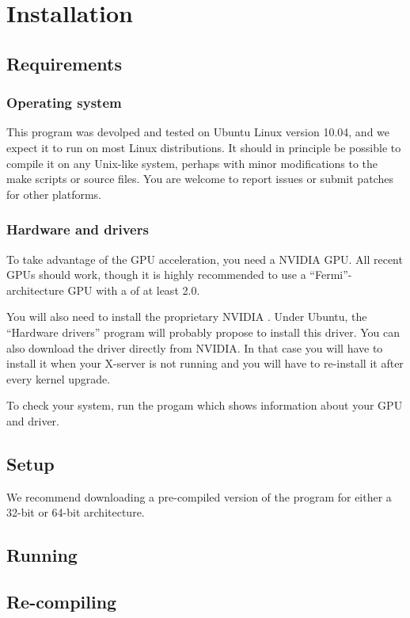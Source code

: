 \section{Installation}

\subsection{Requirements}

\subsubsection{Operating system}

This program was devolped and tested on Ubuntu Linux version 10.04, and we expect it to run on most Linux distributions. It should in principle be possible to compile it on any Unix-like system, perhaps with minor modifications to the make scripts or source files. You are welcome to report issues or submit patches for other platforms.

\subsubsection{Hardware and drivers}

To take advantage of the GPU acceleration, you need a  \textsc{NVIDIA} GPU. All recent GPUs should work, though it is highly recommended to use a ``Fermi''-architecture GPU with a  of at least 2.0.

You will also need to install the proprietary \textsc{NVIDIA} . Under Ubuntu, the ``Hardware drivers'' program will probably propose to install this driver. You can also download the driver directly from \textsc{NVIDIA}. In that case you will have to install it when your X-server is not running and you will have to re-install it after every kernel upgrade.

To check your system, run the progam  which shows information about your GPU and driver.


\subsection{Setup}

We recommend downloading a pre-compiled version of the program for either a 32-bit or 64-bit architecture.

\subsection{Running}

\subsection{Re-compiling}




